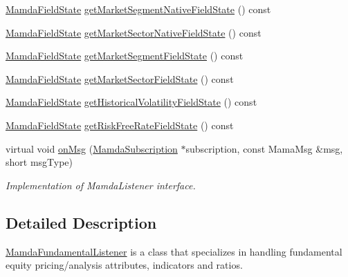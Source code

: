 \begin{CompactItemize}
\item 
\hyperlink{namespaceWombat_93aac974f2ab713554fd12a1fa3b7d2a}{Mamda\-Field\-State} \hyperlink{classWombat_1_1MamdaFundamentalListener_178e08697638bdf25d54e276ec416119}{get\-Market\-Segment\-Native\-Field\-State} () const 
\item 
\hyperlink{namespaceWombat_93aac974f2ab713554fd12a1fa3b7d2a}{Mamda\-Field\-State} \hyperlink{classWombat_1_1MamdaFundamentalListener_7c42cf22f6a4e6167f365df4cdad2c6c}{get\-Market\-Sector\-Native\-Field\-State} () const 
\item 
\hyperlink{namespaceWombat_93aac974f2ab713554fd12a1fa3b7d2a}{Mamda\-Field\-State} \hyperlink{classWombat_1_1MamdaFundamentalListener_5fafb7554fa5481acfb2898b8eec29ae}{get\-Market\-Segment\-Field\-State} () const 
\item 
\hyperlink{namespaceWombat_93aac974f2ab713554fd12a1fa3b7d2a}{Mamda\-Field\-State} \hyperlink{classWombat_1_1MamdaFundamentalListener_4cb742287269d90b2e1484c30d995a6f}{get\-Market\-Sector\-Field\-State} () const 
\item 
\hyperlink{namespaceWombat_93aac974f2ab713554fd12a1fa3b7d2a}{Mamda\-Field\-State} \hyperlink{classWombat_1_1MamdaFundamentalListener_54c2f1ccf72199c1bff116b9e4a43992}{get\-Historical\-Volatility\-Field\-State} () const 
\item 
\hyperlink{namespaceWombat_93aac974f2ab713554fd12a1fa3b7d2a}{Mamda\-Field\-State} \hyperlink{classWombat_1_1MamdaFundamentalListener_d93a5a6643c4f7c742aa588268ba646f}{get\-Risk\-Free\-Rate\-Field\-State} () const 
\item 
virtual void \hyperlink{classWombat_1_1MamdaFundamentalListener_806eae8cea0dfe171fd85662eb1b2297}{on\-Msg} (\hyperlink{classWombat_1_1MamdaSubscription}{Mamda\-Subscription} $\ast$subscription, const Mama\-Msg \&msg, short msg\-Type)
\begin{CompactList}\small\item\em Implementation of Mamda\-Listener interface. \item\end{CompactList}\end{CompactItemize}


\subsection{Detailed Description}
\hyperlink{classWombat_1_1MamdaFundamentalListener}{Mamda\-Fundamental\-Listener} is a class that specializes in handling fundamental equity pricing/analysis attributes, indicators and ratios. 

